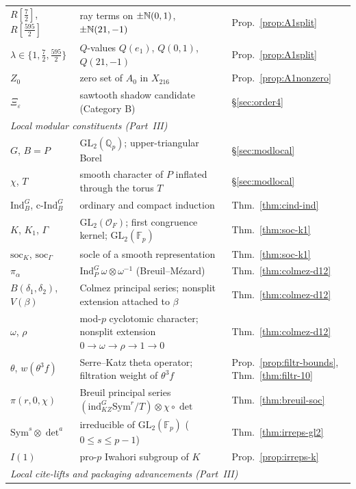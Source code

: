 \begin{center}
\begin{longtable}{p{3.2cm}p{9.3cm}p{2.4cm}}
$R[\frac72]$, $R[\frac{595}2]$ & ray terms on $\pm\mathbb{N}(0,1)$, $\pm\mathbb{N}(21,-1)$ & Prop.~\ref{prop:A1split}\\
$\lambda\in\{1,\frac72,\frac{595}2\}$ & $Q$-values $Q(e_1)$, $Q(0,1)$, $Q(21,-1)$ & Prop.~\ref{prop:A1split}\\
$Z_0$ & zero set of $A_0$ in $X_{216}$ & Prop.~\ref{prop:A1nonzero}\\
$\Xi_\varepsilon$ & sawtooth shadow candidate (Category B) & \S\ref{sec:order4}\\
\multicolumn{3}{l}{\emph{Local modular constituents (Part~III)}}\\
$G$, $B=P$ & $\mathrm{GL}_2(\mathbb{Q}_p)$; upper-triangular Borel & \S\ref{sec:modlocal}\\
$\chi$, $T$ & smooth character of $P$ inflated through the torus $T$ & \S\ref{sec:modlocal}\\
$\mathrm{Ind}_B^G$, $\mathrm{c\text{-}Ind}_B^G$ & ordinary and compact induction & Thm.~\ref{thm:cind-ind}\\
$K$, $K_1$, $\Gamma$ & $\mathrm{GL}_2(\mathcal{O}_F)$; first congruence kernel; $\mathrm{GL}_2(\mathbb{F}_p)$ & Thm.~\ref{thm:soc-k1}\\
$\mathrm{soc}_K$, $\mathrm{soc}_\Gamma$ & socle of a smooth representation & Thm.~\ref{thm:soc-k1}\\
$\pi_\alpha$ & $\mathrm{Ind}_P^G\,\omega\otimes\omega^{-1}$ (Breuil--M\'ezard) & Thm.~\ref{thm:colmez-d12}\\
$B(\delta_1,\delta_2)$, $V(\beta)$ & Colmez principal series; nonsplit extension attached to $\beta$ & Thm.~\ref{thm:colmez-d12}\\
$\omega$, $\rho$ & mod-$p$ cyclotomic character; nonsplit extension $0\to\omega\to\rho\to1\to0$ & Thm.~\ref{thm:colmez-d12}\\
$\theta$, $w(\theta^3 f)$ & Serre--Katz theta operator; filtration weight of $\theta^3 f$ & Prop.~\ref{prop:filtr-bounds}, Thm.~\ref{thm:filtr-10}\\
$\pi(r,0,\chi)$ & Breuil principal series $(\mathrm{ind}_{KZ}^G\mathrm{Sym}^r/T)\otimes\chi\circ\det$ & Thm.~\ref{thm:breuil-soc}\\
$\mathrm{Sym}^s\otimes\det^a$ & irreducible of $\mathrm{GL}_2(\mathbb{F}_p)$ ($0\le s\le p-1$) & Thm.~\ref{thm:irreps-gl2}\\
$I(1)$ & pro-$p$ Iwahori subgroup of $K$ & Prop.~\ref{prop:irreps-k}\\
\multicolumn{3}{l}{\emph{Local cite-lifts and packaging advancements (Part~III)}}\\

\end{longtable}
\end{center}
